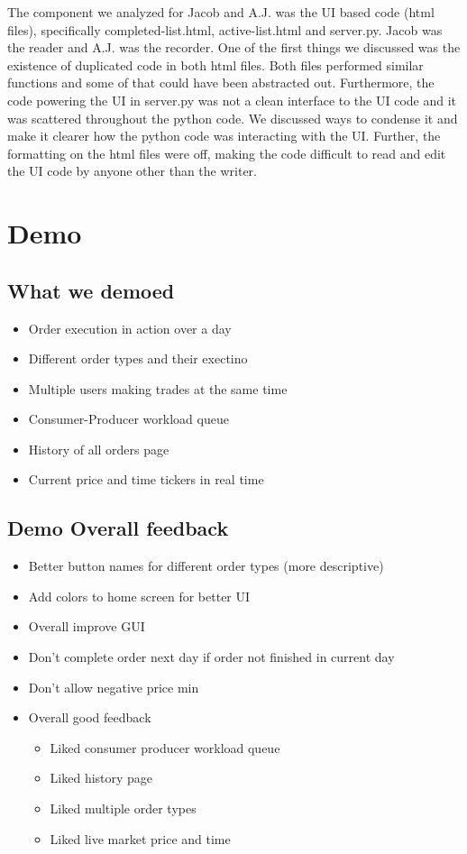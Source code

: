 \documentclass{article}
\begin{document}
The component we analyzed for Jacob and A.J. was the UI based code (html files), specifically completed-list.html, active-list.html and server.py. Jacob was the reader and A.J. was the recorder. One of the first things we discussed was the existence of duplicated code in both html files. Both files performed similar functions and some of that could have been abstracted out. Furthermore, the code powering the UI in server.py was not a clean interface to the UI code and it was scattered throughout the python code. We discussed ways to condense it and make it clearer how the python code was interacting with the UI. Further, the formatting on the html files were off, making the code difficult to read and edit the UI code by anyone other than the writer.

\section{Demo}
\subsection{What we demoed}
\begin{itemize}
\item Order execution in action over a day
\item Different order types and their exectino
\item Multiple users making trades at the same time
\item Consumer-Producer workload queue
\item History of all orders page
\item Current price and time tickers in real time
\end{itemize}

\subsection{Demo Overall feedback}
\begin{itemize}
\item Better button names for different order types (more descriptive)
\item Add colors to home screen for better UI
\item Overall improve GUI
\item Don't complete order next day if order not finished in current day
\item Don't allow negative price min
\item Overall good feedback 
\begin{itemize}
\item Liked consumer producer workload queue
\item Liked history page
\item Liked multiple order types
\item Liked live market price and time
\end{itemize}
\end{itemize}
\end{document}
